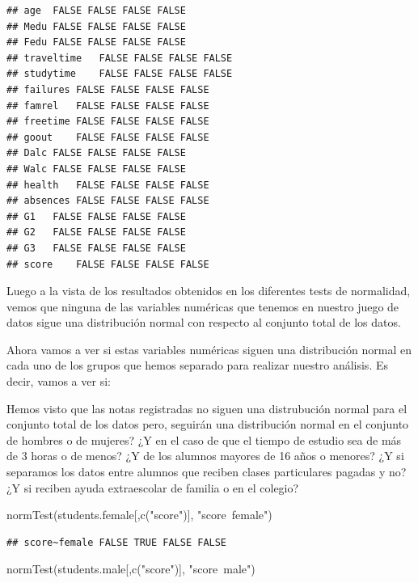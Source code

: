 \documentclass[]{article}
\newenvironment{Shaded}{\begin{snugshade}}{\end{snugshade}}
\newcommand{\KeywordTok}[1]{\textcolor[rgb]{0.94,0.87,0.69}{#1}}
\newcommand{\NormalTok}[1]{\textcolor[rgb]{0.80,0.80,0.80}{#1}}
\newcommand{\StringTok}[1]{\textcolor[rgb]{0.80,0.58,0.58}{#1}}
\begin{document}
\begin{verbatim}
## age  FALSE FALSE FALSE FALSE     
## Medu FALSE FALSE FALSE FALSE     
## Fedu FALSE FALSE FALSE FALSE     
## traveltime   FALSE FALSE FALSE FALSE     
## studytime    FALSE FALSE FALSE FALSE     
## failures FALSE FALSE FALSE FALSE     
## famrel   FALSE FALSE FALSE FALSE     
## freetime FALSE FALSE FALSE FALSE     
## goout    FALSE FALSE FALSE FALSE     
## Dalc FALSE FALSE FALSE FALSE     
## Walc FALSE FALSE FALSE FALSE     
## health   FALSE FALSE FALSE FALSE     
## absences FALSE FALSE FALSE FALSE     
## G1   FALSE FALSE FALSE FALSE     
## G2   FALSE FALSE FALSE FALSE     
## G3   FALSE FALSE FALSE FALSE     
## score    FALSE FALSE FALSE FALSE     
\end{verbatim}

Luego a la vista de los resultados obtenidos en los diferentes tests de
normalidad, vemos que ninguna de las variables numéricas que tenemos en
nuestro juego de datos sigue una distribución normal con respecto al
conjunto total de los datos.

Ahora vamos a ver si estas variables numéricas siguen una distribución
normal en cada uno de los grupos que hemos separado para realizar
nuestro análisis. Es decir, vamos a ver si:

Hemos visto que las notas registradas no siguen una distrubución normal
para el conjunto total de los datos pero, seguirán una distribución
normal en el conjunto de hombres o de mujeres? ¿Y en el caso de que el
tiempo de estudio sea de más de 3 horas o de menos? ¿Y de los alumnos
mayores de 16 años o menores? ¿Y si separamos los datos entre alumnos
que reciben clases particulares pagadas y no? ¿Y si reciben ayuda
extraescolar de familia o en el colegio?

\begin{Shaded}
\begin{Highlighting}[]
\KeywordTok{normTest}\NormalTok{(students.female[,}\KeywordTok{c}\NormalTok{(}\StringTok{"score"}\NormalTok{)], }\StringTok{"score~female"}\NormalTok{)}
\end{Highlighting}
\end{Shaded}

\begin{verbatim}
## score~female FALSE TRUE FALSE FALSE  
\end{verbatim}

\begin{Shaded}
\begin{Highlighting}[]
\KeywordTok{normTest}\NormalTok{(students.male[,}\KeywordTok{c}\NormalTok{(}\StringTok{"score"}\NormalTok{)], }\StringTok{"score~male"}\NormalTok{)}
\end{Highlighting}
\end{Shaded}
\end{document}
